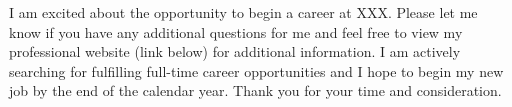 \documentclass[11pt,a4paper,sans]{moderncv}
\begin{document}
	
	\vspace{.5cm} 
	
	I am excited about the opportunity to begin a career at XXX. Please let me know if you have any additional questions for me and feel free to view my professional website (link below) for additional information. I am actively searching for fulfilling full-time career opportunities and I hope to begin my new job by the end of the calendar year. Thank you for your time and consideration.\\
	
	\vspace{1cm}
	
	\makeletterclosing
	
\end{document}
